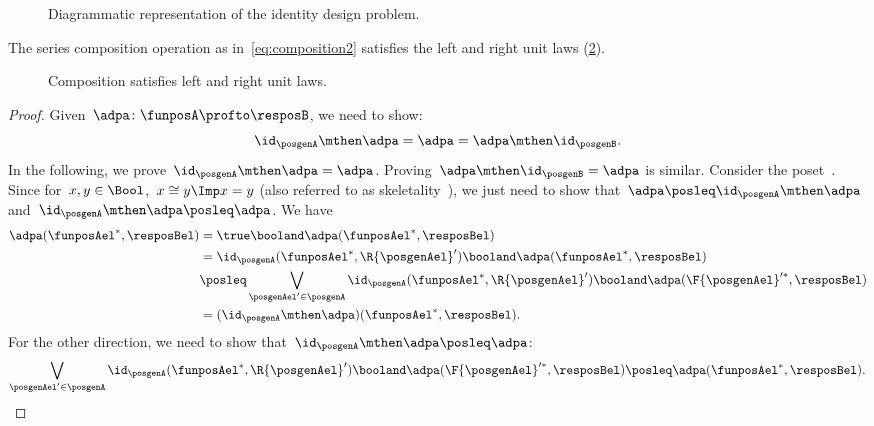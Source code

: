 \begin{figure}[h!]
    \centering
    \caption{Diagrammatic representation of the identity design problem.} \label{fig:identitydp}
\end{figure}

\begin{lemma}
    \label{lem:compositionunital}
    The series composition operation as in~\cref{eq:composition2} satisfies the left and right unit laws (\cref{fig:compositionunital}).
\end{lemma}
\begin{figure}[h!]
    \centering
    \caption{Composition satisfies left and right unit laws.} \label{fig:compositionunital}
\end{figure}
\begin{proof}
    Given~$\adpa\colon \funposA\profto \resposB$, we need to show:
    \begin{equation*}
        \id_\posgenA \mthen \adpa= \adpa = \adpa\mthen \id_\posgenB.
    \end{equation*}
    In the following, we prove~$\id_\posgenA \mthen \adpa = \adpa$.
    Proving~$\adpa\mthen \id_\posgenB=\adpa$ is similar.
    Consider the poset~\Bool. Since for~$x,y\in \Bool$,~$x\cong y \Imp x=y$ (also referred to as skeletality~\cite{fong2019}), we just need to show that~$\adpa\posleq \id_\posgenA\mthen \adpa$ and~$\id_\posgenA\mthen \adpa\posleq \adpa$.
    We have
    \begin{equation*}
        \label{eq:dp_unit_1}
        \begin{aligned}
            \adpa(\funposAel^*,\resposBel)&=\true \booland \adpa(\funposAel^*,\resposBel)\\
            &= \id_\posgenA(\funposAel^*,\R{\posgenAel}') \booland \adpa(\funposAel^*,\resposBel)\\
            &\posleq \bigvee_{\posgenAel' \in \posgenA}\id_\posgenA(\funposAel^*,\R{\posgenAel}')\booland \adpa(\F{\posgenAel}'^*,\resposBel)\\
            &=(\id_\posgenA\mthen \adpa)(\funposAel^*,\resposBel).
        \end{aligned}
    \end{equation*}
    For the other direction, we need to show that~$\id_\posgenA\mthen \adpa\posleq \adpa$:
    \begin{equation*}
        \label{eq:dp_unit_2}
        \bigvee_{\posgenAel'\in \posgenA}\id_\posgenA(\funposAel^*,\R{\posgenAel}')\booland \adpa(\F{\posgenAel}'^*,\resposBel) \posleq \adpa(\funposAel^*,\resposBel).

\end{equation*}
\end{proof}
